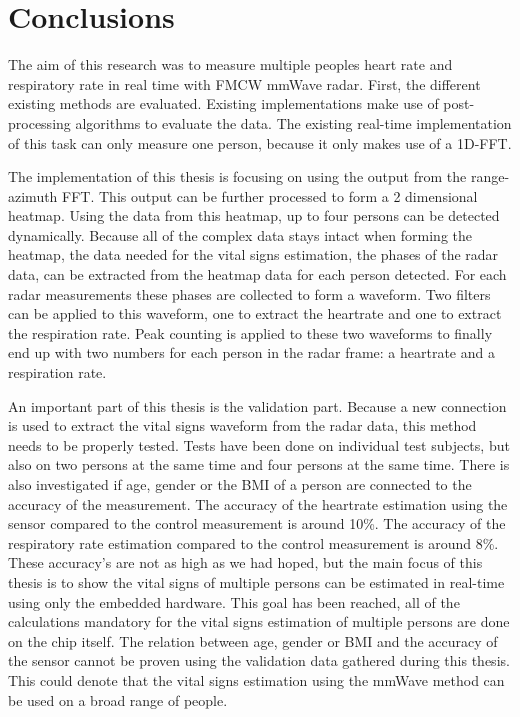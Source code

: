 \chapter{Conclusions}
\label{chp:conclusions}

The aim of this research was to measure multiple peoples heart rate and respiratory rate in real time with FMCW mmWave radar. First, the different existing methods are evaluated. Existing implementations make use of post-processing algorithms to evaluate the data. The existing real-time implementation of this task can only measure one person, because it only makes use of a 1D-FFT. 

The implementation of this thesis is focusing on using the output from the range-azimuth FFT. This output can be further processed to form a 2 dimensional heatmap. Using the data from this heatmap, up to four persons can be detected dynamically. Because all of the complex data stays intact when forming the heatmap, the data needed for the vital signs estimation, the phases of the radar data, can be extracted from the heatmap data for each person detected. For each radar measurements these phases are collected to form a waveform. Two filters can be applied to this waveform, one to extract the heartrate and one to extract the respiration rate. Peak counting is applied to these two waveforms to finally end up with two numbers for each person in the radar frame: a heartrate and a respiration rate.

An important part of this thesis is the validation part. Because a new connection is used to extract the vital signs waveform from the radar data, this method needs to be properly tested. Tests have been done on individual test subjects, but also on two persons at the same time and four persons at the same time. There is also investigated if age, gender or the BMI of a person are connected to the accuracy of the measurement. The accuracy of the heartrate estimation using the sensor compared to the control measurement is around 10\%. The accuracy of the respiratory rate estimation compared to the control measurement is around 8\%. These accuracy's are not as high as we had hoped, but the main focus of this thesis is to show the vital signs of multiple persons can be estimated in real-time using only the embedded hardware. This goal has been reached, all of the calculations mandatory for the vital signs estimation of multiple persons are done on the chip itself. The relation between age, gender or BMI and the accuracy of the sensor cannot be proven using the validation data gathered during this thesis. This could denote that the vital signs estimation using the mmWave method can be used on a broad range of people. 

